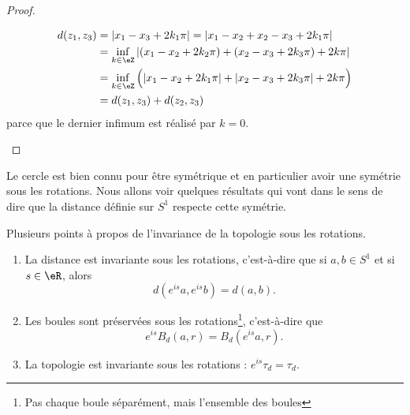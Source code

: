 \begin{proof}
\begin{enumerate}
\begin{itemize}
\begin{subequations}
                        \begin{align}
                            d(z_1,z_3)&=| x_1-x_3+2k_1\pi |=| x_1-x_2+x_2-x_3+2k_1\pi |\\
                            &=\inf_{k\in \eZ}| (x_1-x_2+2k_2\pi)+(x_2-x_3+2k_3\pi)+2k\pi |\\
                            &=\inf_{k\in \eZ}\Big( | x_1-x_2+2k_1\pi |+| x_2-x_3+2k_3\pi |+2k\pi \Big)\\
                            &=d(z_1,z_3)+d(z_2,z_3)
                        \end{align}
                    \end{subequations}
                    parce que le dernier infimum est réalisé par \( k=0\).
            \end{itemize}
        \end{enumerate}
\end{proof}

Le cercle est bien connu pour être symétrique et en particulier avoir une symétrie sous les rotations. Nous allons voir quelques résultats qui vont dans le sens de dire que la distance définie sur \( S^1\) respecte cette symétrie.

\begin{lemma}       \label{LEMooCQCAooAEctbe}
    Plusieurs points à propos de l'invariance de la topologie sous les rotations.
    \begin{enumerate}
        \item
            La distance est invariante sous les rotations, c'est-à-dire que si \( a,b\in S^1\) et si \( s\in \eR\), alors
            \begin{equation}
                d( e^{is}a, e^{is}b)=d(a,b).
            \end{equation}
        \item       \label{ITEMooCIPYooTyPQLj}
            Les boules sont préservées sous les rotations\footnote{Pas chaque boule séparément, mais l'ensemble des boules}, c'est-à-dire que
            \begin{equation}
                e^{is}B_d(a,r)=B_d( e^{is}a,r).
            \end{equation}
        \item
            La topologie est invariante sous les rotations : \(  e^{is}\tau_d=\tau_d\).
    \end{enumerate}
\end{lemma}

